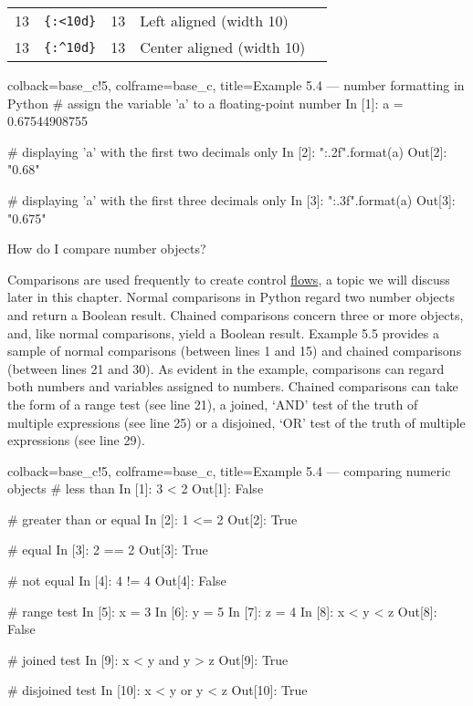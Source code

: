 \documentclass[a4paper,11pt]{book}
\newcommand{\question}[1]{%
    \begin{tcolorbox}[colback=comp_c!10,colframe=comp_c,sidebyside align=top,width=\linewidth,before skip=1ex]
        #1
    \end{tcolorbox}%
    \switchcolumn%
}
\newcommand{\note}[1]{%
    \begin{tcolorbox}[colback=white!0,colframe=white!10,width=\linewidth,before skip=1ex]
        #1
    \end{tcolorbox}         
}
\begin{document}
\begin{table}[!htbp]
\begin{tabular}{cccll}
		13                                  & \texttt{\{:\textless{}10d\}}                 & \multicolumn{1}{l}{13}                                  & Left aligned (width 10)                       &  \\
		13                                  & \texttt{\{:\textasciicircum{}10d\}}          & 13                                  & Center aligned (width 10)           \\
		\bottomrule
	\end{tabular}
\end{table}

\begin{pythoncode}[linenos=true,]{colback=base_c!5, colframe=base_c, title=\sffamily Example 5.4 --- number formatting in Python}
# assign the variable 'a' to a floating-point number
In [1]: a = 0.67544908755

# displaying 'a' with the first two decimals only
In [2]: "{:.2f}".format(a)
Out[2]: "0.68"

# displaying 'a' with the first three decimals only
In [3]: "{:.3f}".format(a)
Out[3]: "0.675"
\end{pythoncode}

\begin{paracol}{2}
	\question{\raggedright{How do I compare number objects?}}
	\note{Comparisons are used frequently to create control \href{https://docs.python.org/3/tutorial/controlflow.html}{flows}, a topic we will discuss later in this chapter. Normal comparisons in Python regard two number objects and return a Boolean result. Chained comparisons concern three or more objects, and, like normal comparisons, yield a Boolean result. Example 5.5 provides a sample of normal comparisons (between lines 1 and 15) and chained comparisons (between lines 21 and 30). As evident in the example, comparisons can regard both numbers and variables assigned to numbers. Chained comparisons can take the form of a range test (see line 21), a joined, `AND' test of the truth of multiple expressions (see line 25) or a disjoined, `OR' test of the truth of multiple expressions (see line 29).}
\end{paracol}
\clearpage

\begin{pythoncode}[linenos=true,]{colback=base_c!5, colframe=base_c, title=\sffamily Example 5.4 --- comparing numeric objects}
# less than
In [1]: 3 < 2
Out[1]: False

# greater than or equal
In [2]: 1 <= 2
Out[2]: True

# equal
In [3]: 2 == 2
Out[3]: True 

# not equal
In [4]: 4 != 4
Out[4]: False

# range test
In [5]: x = 3
In [6]: y = 5
In [7]: z = 4
In [8]: x < y < z
Out[8]: False

# joined test
In [9]: x < y and y > z
Out[9]: True

# disjoined test
In [10]: x < y or y < z
Out[10]: True 

\end{pythoncode}
\end{document}
